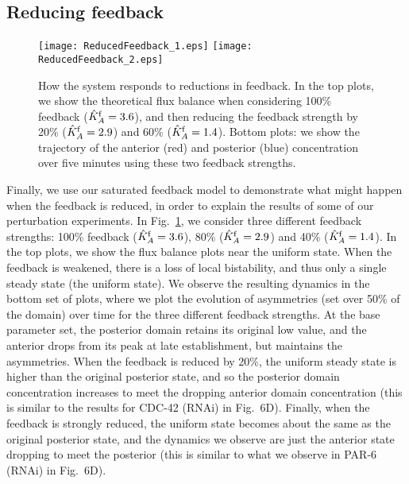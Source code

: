 \documentclass[11pt]{article}
\newcommand{\6}[1]{#1_{\text{6}}}
\newcommand{\3}[1]{#1_{\text{3}}}
\begin{document}
\subsection{Reducing feedback}
\begin{figure}
\centering
\texttt{[image: ReducedFeedback\_1.eps]}
\texttt{[image: ReducedFeedback\_2.eps]}
\caption{\label{fig:FBReduce}How the system responds to reductions in feedback. In the top plots, we show the theoretical flux balance when considering 100\% feedback ($\hat{K}^\text{f}_A=3.6$), and then reducing the feedback strength by 20\% ($\hat{K}^\text{f}_A=2.9$) and 60\% ($\hat{K}^\text{f}_A=1.4$). Bottom plots: we show the trajectory of the anterior (red) and posterior (blue) concentration over five minutes using these two feedback strengths.}
\end{figure}

Finally, we use our saturated feedback model to demonstrate what might happen when the feedback is reduced, in order to explain the results of some of our perturbation experiments. In Fig.\ \ref{fig:FBReduce}, we consider three different feedback strengths: 100\% feedback ($\hat{K}^\text{f}_A=3.6$), 80\% ($\hat{K}^\text{f}_A=2.9$) and 40\% ($\hat{K}^\text{f}_A=1.4$). In the top plots, we show the flux balance plots near the uniform state. When the feedback is weakened, there is a loss of local bistability, and thus only a single steady state (the uniform state). We observe the resulting dynamics in the bottom set of plots, where we plot the evolution of asymmetries (set over 50\% of the domain) over time for the three different feedback strengths. At the base parameter set, the posterior domain retains its original low value, and the anterior drops from its peak at late establishment, but maintains the asymmetries. When the feedback is reduced by 20\%, the uniform steady state is higher than the original posterior state, and so the posterior domain concentration increases to meet the dropping anterior domain concentration (this is similar to the results for CDC-42 (RNAi) in Fig.\ 6D). Finally, when the feedback is strongly reduced, the uniform state becomes about the same as the original posterior state, and the dynamics we observe are just the anterior state dropping to meet the posterior (this is similar to what we observe in PAR-6 (RNAi) in Fig.\ 6D).
\end{document}
